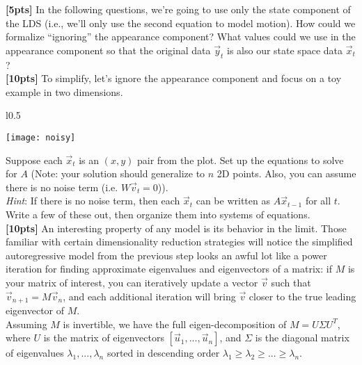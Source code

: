 \documentclass[paper=a4, fontsize=11pt]{scrartcl} %
\numberwithin{figure}{section} %
\numberwithin{table}{section} %
\begin{document}
\textbf{[5pts]} In the following questions, we're going to use only the state component of the LDS (i.e., we'll only use the second equation to model motion). How could we formalize ``ignoring'' the appearance component? What values could we use in the appearance component so that the original data $\vec{y}_t$ is also our state space data $\vec{x}_t$? \\

\textbf{[10pts]} To simplify, let's ignore the appearance component and focus on a toy example in two dimensions. \\

\begin{wrapfigure}{l}{0.5\textwidth}
	\vspace{-3.5em}
	\begin{center}
		\texttt{[image: noisy]}
	\end{center}
	\vspace{-2.5em}
\end{wrapfigure}

Suppose each $\vec{x}_t$ is an $(x, y)$ pair from the plot. Set up the equations to solve for $A$ (Note: your solution should generalize to $n$ 2D points. Also, you can assume there is no noise term (i.e. $W\vec{v}_t = 0$)). \\

\emph{Hint}: If there is no noise term, then each $\vec{x}_t$ can be written as $A\vec{x}_{t - 1}$ for all $t$. Write a few of these out, then organize them into systems of equations. \\

\textbf{[10pts]} An interesting property of any model is its behavior in the limit. Those familiar with certain dimensionality reduction strategies will notice the simplified autoregressive model from the previous step looks an awful lot like a power iteration for finding approximate eigenvalues and eigenvectors of a matrix: if $M$ is your matrix of interest, you can iteratively update a vector $\vec{v}$ such that $\vec{v}_{n + 1} = M\vec{v}_n$, and each additional iteration will bring $\vec{v}$ closer to the true leading eigenvector of $M$. \\

Assuming $M$ is invertible, we have the full eigen-decomposition of $M = U \Sigma U^T$, where $U$ is the matrix of eigenvectors $\left[ \vec{u}_1, ..., \vec{u}_n \right]$, and $\Sigma$ is the diagonal matrix of eigenvalues $\lambda_1, ..., \lambda_n$ sorted in descending order $\lambda_1 \ge \lambda_2 \ge ... \ge \lambda_n$. \\
\end{document}
